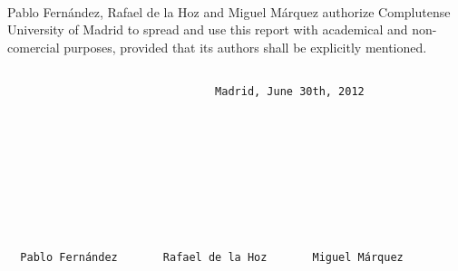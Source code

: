 \paragraph{}
Pablo Fernández, Rafael de la Hoz and Miguel Márquez authorize Complutense University 
of Madrid to spread and use this report with academical and non-comercial purposes,
provided that its authors shall be explicitly mentioned.
\begin{verbatim}

                                Madrid, June 30th, 2012










  Pablo Fernández       Rafael de la Hoz       Miguel Márquez
\end{verbatim}
